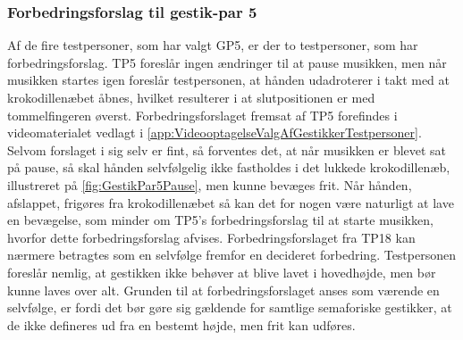 \subsubsection{Forbedringsforslag til gestik-par 5}
\label{TestresultaterValgAfGestikkerForbedringGP5Pause}
%
Af de fire testpersoner, som har valgt GP5, er der to testpersoner, som har forbedringsforslag. TP5 foreslår ingen ændringer til at pause musikken, men når musikken startes igen foreslår testpersonen, at hånden udadroterer i takt med at krokodillenæbet åbnes, hvilket resulterer i at slutpositionen er med tommelfingeren øverst. Forbedringsforslaget fremsat af TP5 forefindes i videomaterialet vedlagt i \autoref{app:VideooptagelseValgAfGestikkerTestpersoner}. Selvom forslaget i sig selv er fint, så forventes det, at når musikken er blevet sat på pause, så skal hånden selvfølgelig ikke fastholdes i det lukkede krokodillenæb, illustreret på \autoref{fig:GestikPar5Pause}, men kunne bevæges frit. Når hånden, afslappet, frigøres fra krokodillenæbet så kan det for nogen være naturligt at lave en bevægelse, som minder om TP5's forbedringsforslag til at starte musikken, hvorfor dette forbedringsforslag afvises. Forbedringsforslaget fra TP18 kan nærmere betragtes som en selvfølge fremfor en decideret forbedring. Testpersonen foreslår nemlig, at gestikken ikke behøver at blive lavet i hovedhøjde, men bør kunne laves over alt. Grunden til at forbedringsforslaget anses som værende en selvfølge, er fordi det bør gøre sig gældende for samtlige semaforiske gestikker, at de ikke defineres ud fra en bestemt højde, men frit kan udføres.
%
